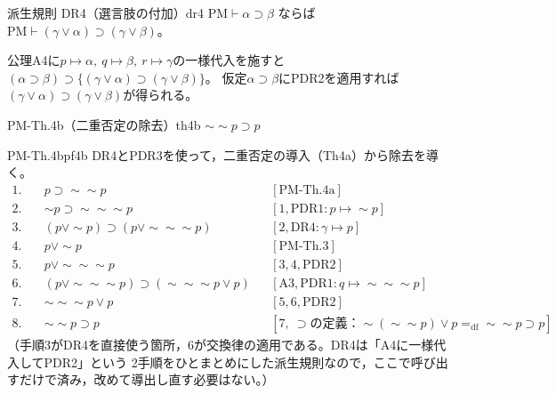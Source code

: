 \documentclass[autodetect-engine,dvi=dvipdfmx,ja=standard]{bxjsarticle}
\begin{document}
\begin{remark}{派生規則 DR4（選言肢の付加）}{dr4}
\(\mathrm{PM}\vdash\alpha\supset\beta\) ならば \(\mathrm{PM}\vdash(\gamma\lor\alpha)\supset(\gamma\lor\beta)\)。

公理A4に\(p\mapsto\alpha,\ q\mapsto\beta,\ r\mapsto\gamma\)の一様代入を施すと
\((\alpha\supset\beta)\supset\{(\gamma\lor\alpha)\supset(\gamma\lor\beta)\}\)。
仮定\(\alpha\supset\beta\)にPDR2を適用すれば\((\gamma\lor\alpha)\supset(\gamma\lor\beta)\)が得られる。
\end{remark}

\begin{theorem}{PM-Th.4b（二重否定の除去）}{th4b}
\(\sim\sim p\supset p\)
\end{theorem}
\begin{tproof}{PM-Th.4b}{pf4b}
DR4とPDR3を使って，二重否定の導入（Th4a）から除去を導く。
\begin{align*}
  1.\quad & p\supset\sim\sim p && [\mathrm{PM\text{-}Th.4a}]\\
  2.\quad & \sim p\supset\sim\sim\sim p && [1,\mathrm{PDR1}: p\mapsto\sim p]\\
  3.\quad & (p\lor\sim p)\supset(p\lor\sim\sim\sim p) && [2,\mathrm{DR4}: \gamma\mapsto p]\\
  4.\quad & p\lor\sim p && [\mathrm{PM\text{-}Th.3}]\\
  5.\quad & p\lor\sim\sim\sim p && [3,4,\mathrm{PDR2}]\\
  6.\quad & (p\lor\sim\sim\sim p)\supset(\sim\sim\sim p\lor p) && [\mathrm{A3},\mathrm{PDR1}: q\mapsto\sim\sim\sim p]\\
  7.\quad & \sim\sim\sim p\lor p && [5,6,\mathrm{PDR2}]\\
  8.\quad & \sim\sim p\supset p && [7,\ \supset\text{の定義：}\sim(\sim\sim p)\lor p=_{\mathrm{df}}\sim\sim p\supset p]
\end{align*}
（手順3がDR4を直接使う箇所，6が交換律の適用である。DR4は「A4に一様代入してPDR2」という
2手順をひとまとめにした派生規則なので，ここで呼び出すだけで済み，改めて導出し直す必要はない。）
\end{tproof}
\end{document}
